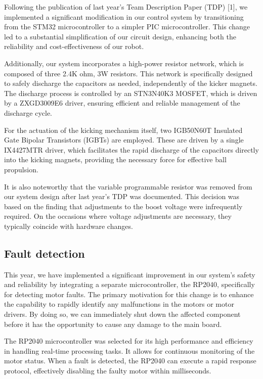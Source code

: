 \documentclass[runningheads]{llncs}
\begin{document}
Following the publication of last year's Team Description Paper (TDP) [1], we implemented a significant modification in our control system by transitioning from the STM32 microcontroller to a simpler PIC microcontroller. This change led to a substantial simplification of our circuit design, enhancing both the reliability and cost-effectiveness of our robot.

Additionally, our system incorporates a high-power resistor network, which is composed of three 2.4K ohm, 3W resistors. This network is specifically designed to safely discharge the capacitors as needed, independently of the kicker magnets. The discharge process is controlled by an STN3N40K3 MOSFET, which is driven by a ZXGD3009E6 driver, ensuring efficient and reliable management of the discharge cycle.

For the actuation of the kicking mechanism itself, two IGB50N60T Insulated Gate Bipolar Transistors (IGBTs) are employed. These are driven by a single IX4427MTR driver, which facilitates the rapid discharge of the capacitors directly into the kicking magnets, providing the necessary force for effective ball propulsion.

It is also noteworthy that the variable programmable resistor was removed from our system design after last year's TDP was documented. This decision was based on the finding that adjustments to the boost voltage were infrequently required. On the occasions where voltage adjustments are necessary, they typically coincide with hardware changes.
\subsection{Fault detection}

This year, we have implemented a significant improvement in our system's safety and reliability by integrating a separate microcontroller, the RP2040, specifically for detecting motor faults. The primary motivation for this change is to enhance the capability to rapidly identify any malfunctions in the motors or motor drivers. By doing so, we can immediately shut down the affected component before it has the opportunity to cause any damage to the main board.

The RP2040 microcontroller was selected for its high performance and efficiency in handling real-time processing tasks. It allows for continuous monitoring of the motor status. When a fault is detected, the RP2040 can execute a rapid response protocol, effectively disabling the faulty motor within milliseconds.
\end{document}
